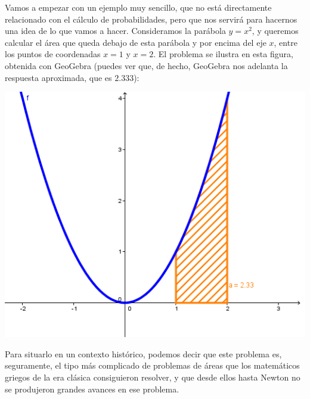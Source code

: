 \documentclass[10pt,a4paper]{article}\usepackage[]{graphicx}\usepackage[]{color}
\newcounter{cont01}
\begin{document}
Vamos a empezar con un ejemplo muy sencillo, que no está directamente relacionado con el cálculo de probabilidades, pero que nos servirá para hacernos una idea de lo que vamos a hacer. Consideramos la parábola $y= x^2$, y queremos calcular el área que queda debajo de esta parábola y por encima del eje $x$, entre los puntos de coordenadas $x=1$ y $x=2$. El problema se ilustra en esta figura, obtenida con GeoGebra (puedes ver que, de hecho, GeoGebra nos adelanta la respuesta aproximada, que es $2.333$):
\begin{center}
    \includegraphics[width=14cm]{../fig/Tut05-40.png}
\end{center}
Para situarlo en un contexto histórico, podemos decir que este problema es, seguramente, el tipo más complicado de problemas de áreas que los matemáticos griegos de la era clásica consiguieron resolver, y que desde ellos hasta Newton no se produjeron grandes avances en ese problema.
\end{document}
